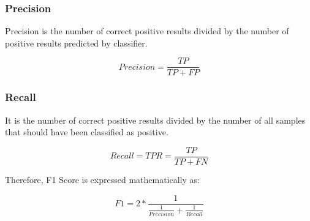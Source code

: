 \subsubsection{Precision}

Precision is the number of correct positive results divided by the number of positive results predicted by classifier.

\begin{equation}
Precision = \frac{TP}{TP+FP}
\end{equation}

\subsubsection{Recall}

It is the number of correct positive results divided by the number of all samples that should have been classified as positive.

\begin{equation}
Recall = TPR = \frac{TP}{TP+FN}
\end{equation}

Therefore, F1 Score is expressed mathematically as:

\begin{equation}
F1 = 2*\frac{1}{\frac{1}{Precision}+\frac{1}{Recall}}
\end{equation}



